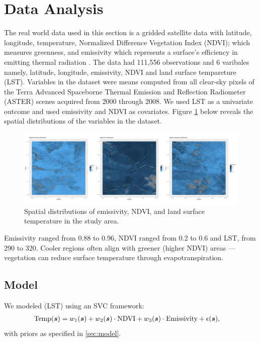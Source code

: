 \section{Data Analysis}
\label{sec:data analysis}
The real world data used in this section is a gridded satellite data with latitude, longitude, temperature, Normalized Difference Vegetation Index (NDVI); which measures greenness, and emissivity which represents a surface's efficiency in emitting thermal radiation \citep{hulley_new_2008, hulley_aster_2008, hulley_north_2009, hulley_validation_2009, hulley_generating_2011, hulley_quantifying_2012, nasa_jpl_aster_2014, hulley_span_2015}.
The data had 111,556 observations and 6 varibales namely, latitude, longitude, emissivity, NDVI and land surface tempareture (LST). Variables in the dataset were means computed from all clear-sky pixels of the Terra Advanced Spaceborne Thermal Emission and Reflection Radiometer (ASTER) scenes acquired from 2000 through 2008.
We used LST as a univariate outcome and used emissivity and NDVI as covariates.
Figure \ref{fig:spatialpatterns} below reveals the spatial  distributions of the variables in the dataset.

 \begin{figure}[H]
 \centering
 \includegraphics[width=\textwidth]{../../figures/spatial_horizontal_stack.png}
 \caption{
   Spatial distributions of emissivity, NDVI, and  land surface temperature in the study area. 
 }
 \label{fig:spatialpatterns}
 \end{figure}
 
  Emissivity ranged from 0.88 to 0.96, NDVI ranged from 0.2 to 0.6  and LST, from 290 to 320.  
 Cooler regions often align with greener (higher NDVI) areas — vegetation can reduce surface temperature through evapotranspiration.
\subsection{Model}
We modeled (LST) using an SVC framework:
\begin{align*}
\text{Temp}(\boldsymbol{s}) &= w_1(\boldsymbol{s}) + w_2(\boldsymbol{s})\cdot\text{NDVI} + w_3(\boldsymbol{s})\cdot\text{Emissivity} + \epsilon(\boldsymbol{s}),
\end{align*}
with priors as specified in \ref{sec:model}.

